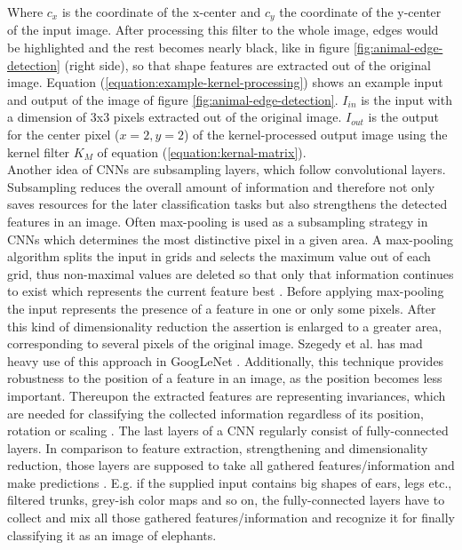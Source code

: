 \documentclass[12pt,twoside]{article}
\theoremstyle{plain}
\theoremstyle{definition}
\theoremstyle{remark}
\begin{document}
\noindent Where $c_x$ is the coordinate of the x-center and $c_y$ the coordinate of the y-center of the input image. After processing this filter to the whole image, edges would be highlighted and the rest becomes nearly black, like in figure \ref{fig:animal-edge-detection} (right side), so that shape features are extracted out of the original image.
Equation (\ref{equation:example-kernel-processing}) shows an example input and output of the image of figure \ref{fig:animal-edge-detection}. $I_{in}$ is the input with a dimension of 3x3 pixels extracted out of the original image. $I_{out}$ is the output for the center pixel ($x=2, y=2$) of the kernel-processed output image using the kernel filter $K_M$ of equation (\ref{equation:kernal-matrix}).
\\
Another idea of CNNs are subsampling layers, which follow convolutional layers. Subsampling reduces the overall amount of information and therefore not only saves resources for the later classification tasks but also strengthens the detected features in an image. Often max-pooling is used as a subsampling strategy in CNNs \cite{DeepNeuralNetworksObjectDetection-Szegedy, ImangeNetClassificationCNN-Krizhevsky} which determines the most distinctive pixel in a given area.
A max-pooling algorithm splits the input in grids and selects the maximum value out of each grid, thus non-maximal values are deleted so that only that information continues to exist which represents the current feature best \cite{GoogLeNet, ImangeNetClassificationCNN-Krizhevsky}.
Before applying max-pooling the input represents the presence of a feature in one or only some pixels. After this kind of dimensionality reduction the assertion is enlarged to a greater area, corresponding to several pixels of the original image. Szegedy et al. has mad heavy use of this approach in GoogLeNet \cite{GoogLeNet}.
Additionally, this technique provides robustness to the position of a feature in an image, as the position becomes less important. Thereupon the extracted features are representing invariances, which are needed for classifying the collected information regardless of its position, rotation or scaling \cite{Invariances-Neural-Network-Khotanzad}.
The last layers of a CNN regularly consist of fully-connected layers. In comparison to feature extraction, strengthening and dimensionality reduction, those layers are supposed to take all gathered features/information and make predictions \cite{DeepNeuralNetworksObjectDetection-Szegedy, Multi-column-dnn-for-traffic-signs-ciresan, MultiColumnDeepNeuralNetworksClassification-Ciresan}. E.g. if the supplied input contains big shapes of ears, legs etc., filtered trunks, grey-ish color maps and so on, the fully-connected layers have to collect and mix all those gathered features/information and recognize it for finally classifying it as an image of elephants.
\end{document}

